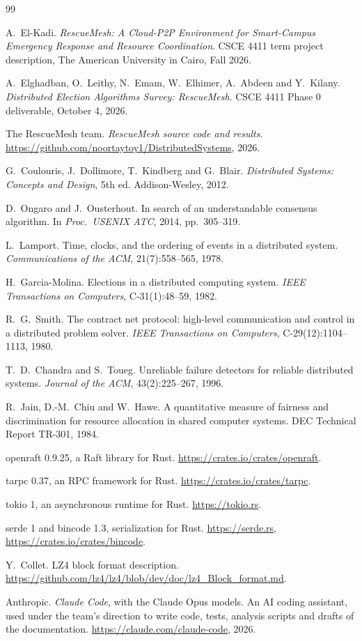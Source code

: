 \documentclass[10pt,a4paper]{article}
\begin{document}
\newpage
\begin{thebibliography}{99}
\small

 A.~El-Kadi. \emph{RescueMesh: A Cloud-P2P Environment for Smart-Campus Emergency Response and Resource Coordination}. CSCE 4411 term project description, The American University in Cairo, Fall 2026.

 A.~Elghadban, O.~Leithy, N.~Emam, W.~Elhimer, A.~Abdeen and Y.~Kilany. \emph{Distributed Election Algorithms Survey: RescueMesh}. CSCE 4411 Phase 0 deliverable, October 4, 2026.

 The RescueMesh team. \emph{RescueMesh source code and results}. \url{https://github.com/noortaytoy1/DistributedSystems}, 2026.

 G.~Coulouris, J.~Dollimore, T.~Kindberg and G.~Blair. \emph{Distributed Systems: Concepts and Design}, 5th ed. Addison-Wesley, 2012.

 D.~Ongaro and J.~Ousterhout. In search of an understandable consensus algorithm. In \emph{Proc.\ USENIX ATC}, 2014, pp.~305--319.

 L.~Lamport. Time, clocks, and the ordering of events in a distributed system. \emph{Communications of the ACM}, 21(7):558--565, 1978.

 H.~Garcia-Molina. Elections in a distributed computing system. \emph{IEEE Transactions on Computers}, C-31(1):48--59, 1982.

 R.~G.~Smith. The contract net protocol: high-level communication and control in a distributed problem solver. \emph{IEEE Transactions on Computers}, C-29(12):1104--1113, 1980.

 T.~D.~Chandra and S.~Toueg. Unreliable failure detectors for reliable distributed systems. \emph{Journal of the ACM}, 43(2):225--267, 1996.

 R.~Jain, D.-M.~Chiu and W.~Hawe. A quantitative measure of fairness and discrimination for resource allocation in shared computer systems. DEC Technical Report TR-301, 1984.

 openraft 0.9.25, a Raft library for Rust. \url{https://crates.io/crates/openraft}.

 tarpc 0.37, an RPC framework for Rust. \url{https://crates.io/crates/tarpc}.

 tokio 1, an asynchronous runtime for Rust. \url{https://tokio.rs}.

 serde 1 and bincode 1.3, serialization for Rust. \url{https://serde.rs}, \url{https://crates.io/crates/bincode}.

 Y.~Collet. LZ4 block format description. \url{https://github.com/lz4/lz4/blob/dev/doc/lz4_Block_format.md}.

 Anthropic. \emph{Claude Code}, with the Claude Opus models. An AI coding assistant, used under the team's direction to write code, tests, analysis scripts and drafts of the documentation. \url{https://claude.com/claude-code}, 2026.

\end{thebibliography}

\appendix

\end{document}
